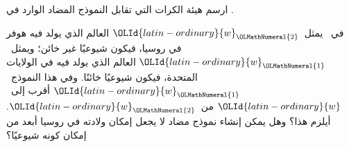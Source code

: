 \documentclass[../../../include/open-logic-section]{subfiles}
\begin{document}
\begin{prob}
ارسم هيئة الكرات التي تقابل النموذج المضاد الوارد في
.
\end{prob}

\begin{prob}
  في~ يمثل~${\OLId{latin-ordinary}{w}}_{\OLMathNumeral{2}}$ العالم الذي
  يولد فيه هوفر في روسيا، فيكون شيوعيًا غير خائن؛ ويمثل~${\OLId{latin-ordinary}{w}}_{\OLMathNumeral{1}}$ العالم
  الذي يولد فيه في الولايات المتحدة، فيكون شيوعيًا خائنًا. وفي هذا
  النموذج~${\OLId{latin-ordinary}{w}}_{\OLMathNumeral{1}}$ أقرب إلى~${\OLId{latin-ordinary}{w}}$ من~${\OLId{latin-ordinary}{w}}_{\OLMathNumeral{2}}$. أيلزم هذا؟ وهل يمكن إنشاء
  نموذج مضاد لا يجعل إمكان ولادته في روسيا أبعد من إمكان كونه شيوعيًا؟
\end{prob}
\end{document}
